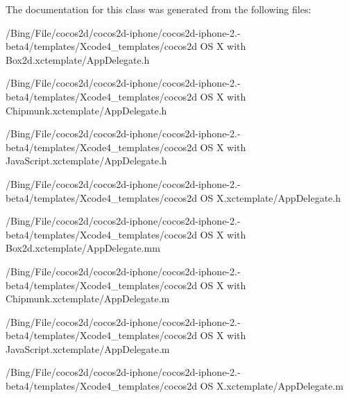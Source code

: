 The documentation for this class was generated from the following files\-:\begin{DoxyCompactItemize}
\item 
/\-Bing/\-File/cocos2d/cocos2d-\/iphone/cocos2d-\/iphone-\/2.-\/beta4/templates/\-Xcode4\-\_\-templates/cocos2d O\-S X with Box2d.\-xctemplate/App\-Delegate.\-h\item 
/\-Bing/\-File/cocos2d/cocos2d-\/iphone/cocos2d-\/iphone-\/2.-\/beta4/templates/\-Xcode4\-\_\-templates/cocos2d O\-S X with Chipmunk.\-xctemplate/App\-Delegate.\-h\item 
/\-Bing/\-File/cocos2d/cocos2d-\/iphone/cocos2d-\/iphone-\/2.-\/beta4/templates/\-Xcode4\-\_\-templates/cocos2d O\-S X with Java\-Script.\-xctemplate/App\-Delegate.\-h\item 
/\-Bing/\-File/cocos2d/cocos2d-\/iphone/cocos2d-\/iphone-\/2.-\/beta4/templates/\-Xcode4\-\_\-templates/cocos2d O\-S X.\-xctemplate/App\-Delegate.\-h\item 
/\-Bing/\-File/cocos2d/cocos2d-\/iphone/cocos2d-\/iphone-\/2.-\/beta4/templates/\-Xcode4\-\_\-templates/cocos2d O\-S X with Box2d.\-xctemplate/App\-Delegate.\-mm\item 
/\-Bing/\-File/cocos2d/cocos2d-\/iphone/cocos2d-\/iphone-\/2.-\/beta4/templates/\-Xcode4\-\_\-templates/cocos2d O\-S X with Chipmunk.\-xctemplate/App\-Delegate.\-m\item 
/\-Bing/\-File/cocos2d/cocos2d-\/iphone/cocos2d-\/iphone-\/2.-\/beta4/templates/\-Xcode4\-\_\-templates/cocos2d O\-S X with Java\-Script.\-xctemplate/App\-Delegate.\-m\item 
/\-Bing/\-File/cocos2d/cocos2d-\/iphone/cocos2d-\/iphone-\/2.-\/beta4/templates/\-Xcode4\-\_\-templates/cocos2d O\-S X.\-xctemplate/App\-Delegate.\-m\end{DoxyCompactItemize}
